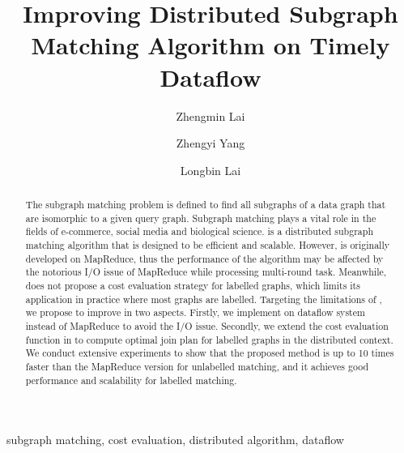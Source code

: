 \documentclass[conference]{IEEEtran}
\begin{document}
\title{Improving Distributed Subgraph Matching Algorithm on Timely Dataflow}

\author[1]{Zhengmin Lai}
\author[2]{Zhengyi Yang}
\author[2]{Longbin Lai}

\maketitle

\begin{abstract}
The subgraph matching problem is defined to find all subgraphs of a data graph that are isomorphic to a given query graph. Subgraph matching plays a vital role in the fields of e-commerce, social media and biological science. \cliquejoin is a distributed subgraph matching algorithm that is designed to be efficient and scalable. However, \cliquejoin is originally developed on MapReduce, thus the performance of the algorithm may be affected by the notorious I/O issue of MapReduce while processing multi-round task. Meanwhile, \cliquejoin does not propose a cost evaluation strategy for labelled graphs, which limits its application in practice where most graphs are labelled. Targeting the limitations of \cliquejoin, we propose \gencliqjoin to improve \cliquejoin in two aspects. Firstly, we implement \cliquejoin on \timely dataflow system instead of MapReduce to avoid the I/O issue. Secondly, we extend the cost evaluation function in \cliquejoin to compute optimal join plan for labelled graphs in the distributed context. We conduct extensive experiments to show that the proposed method is up to 10 times faster than the MapReduce version for unlabelled matching, and it achieves good performance and scalability for labelled matching.
\end{abstract}

\begin{IEEEkeywords}
 subgraph matching, cost evaluation, distributed algorithm, dataflow
\end{IEEEkeywords}















\end{document}

